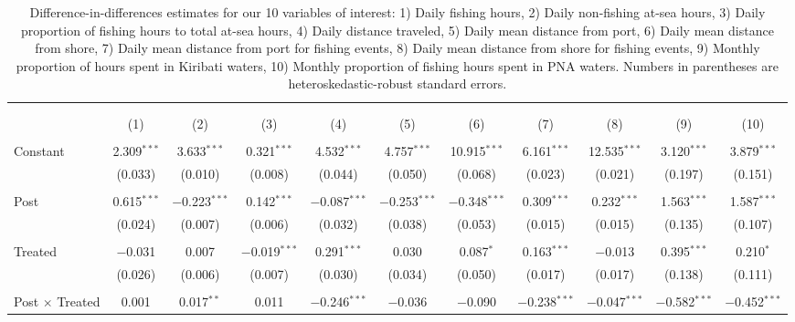 
\begin{table}[!htbp] \centering 
  \caption{\label{tab:main_DID}Difference-in-differences estimates for our 10 variables of interest: 1) Daily fishing hours, 2) Daily non-fishing at-sea hours, 3) Daily proportion of fishing hours to total at-sea hours, 4) Daily distance traveled, 5) Daily mean distance from port, 6) Daily mean distance from shore, 7) Daily mean distance from port for fishing events, 8) Daily mean distance from shore for fishing events, 9) Monthly proportion of hours spent in Kiribati waters, 10) Monthly proportion of fishing hours spent in PNA waters. Numbers in parentheses are heteroskedastic-robust standard errors.} 
  \label{} 
\footnotesize 
\begin{tabular}{@{\extracolsep{1pt}}lcccccccccc} 
\\[-1.8ex]\hline 
\hline \\[-1.8ex] 
\\[-1.8ex] & (1) & (2) & (3) & (4) & (5) & (6) & (7) & (8) & (9) & (10)\\ 
\hline \\[-1.8ex] 
 Constant & 2.309$^{***}$ & 3.633$^{***}$ & 0.321$^{***}$ & 4.532$^{***}$ & 4.757$^{***}$ & 10.915$^{***}$ & 6.161$^{***}$ & 12.535$^{***}$ & 3.120$^{***}$ & 3.879$^{***}$ \\ 
  & (0.033) & (0.010) & (0.008) & (0.044) & (0.050) & (0.068) & (0.023) & (0.021) & (0.197) & (0.151) \\ 
  & & & & & & & & & & \\ 
 Post & 0.615$^{***}$ & $-$0.223$^{***}$ & 0.142$^{***}$ & $-$0.087$^{***}$ & $-$0.253$^{***}$ & $-$0.348$^{***}$ & 0.309$^{***}$ & 0.232$^{***}$ & 1.563$^{***}$ & 1.587$^{***}$ \\ 
  & (0.024) & (0.007) & (0.006) & (0.032) & (0.038) & (0.053) & (0.015) & (0.015) & (0.135) & (0.107) \\ 
  & & & & & & & & & & \\ 
 Treated & $-$0.031 & 0.007 & $-$0.019$^{***}$ & 0.291$^{***}$ & 0.030 & 0.087$^{*}$ & 0.163$^{***}$ & $-$0.013 & 0.395$^{***}$ & 0.210$^{*}$ \\ 
  & (0.026) & (0.006) & (0.007) & (0.030) & (0.034) & (0.050) & (0.017) & (0.017) & (0.138) & (0.111) \\ 
  & & & & & & & & & & \\ 
 Post $\times$ Treated & 0.001 & 0.017$^{**}$ & 0.011 & $-$0.246$^{***}$ & $-$0.036 & $-$0.090 & $-$0.238$^{***}$ & $-$0.047$^{***}$ & $-$0.582$^{***}$ & $-$0.452$^{***}$ \\ 

\end{tabular}
\end{table}

